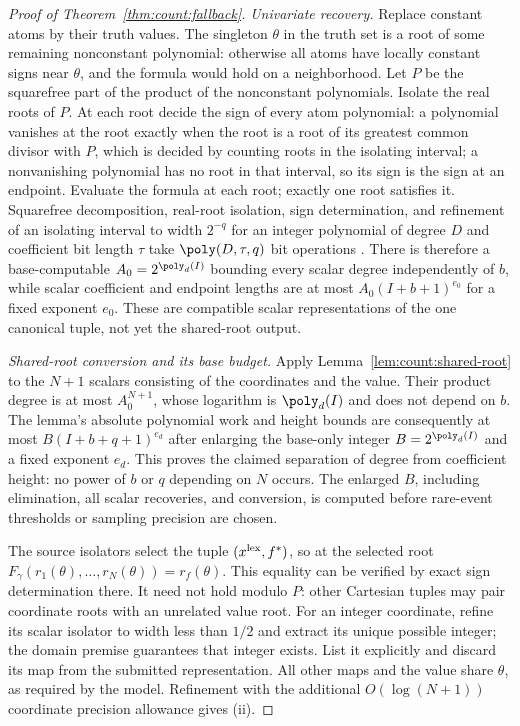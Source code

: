 \begin{proof}[Proof of Theorem~\ref{thm:count:fallback}]
\emph{Univariate recovery.} Replace constant atoms by their truth values. The
singleton $\theta$ in the truth set is a root of some remaining nonconstant
polynomial: otherwise all atoms have locally constant signs near $\theta$, and
the formula would hold on a neighborhood. Let $P$ be the squarefree part of
the product of the nonconstant polynomials. Isolate the real roots of $P$.
At each root decide the sign of every atom polynomial: a polynomial vanishes
at the root exactly when the root is a root of its greatest common divisor
with $P$, which is decided by counting roots in the isolating interval; a
nonvanishing polynomial has no root in that interval, so its sign is the sign
at an endpoint. Evaluate the formula at each root; exactly one root satisfies
it. Squarefree decomposition, real-root isolation, sign determination, and
refinement of an isolating interval to width $2^{-q}$ for an integer
polynomial of degree $D$ and coefficient bit length $\tau$ take
$\poly(D,\tau,q)$ bit operations
\cite{basu2006-algorithms-in-real-algebraic-geometry,mehlhorn2015-from-approximate-factorization-to-root}.
There is therefore a base-computable $A_0=2^{\poly_d(I)}$ bounding every
scalar degree independently of $b$, while scalar coefficient and endpoint
lengths are at most $A_0(I+b+1)^{e_0}$ for a fixed exponent $e_0$.
These are compatible scalar representations of the one canonical tuple,
not yet the shared-root output.

\emph{Shared-root conversion and its base budget.} Apply
Lemma~\ref{lem:count:shared-root} to the $N+1$ scalars consisting of the
coordinates and the value. Their product degree is at most
$A_0^{N+1}$, whose logarithm is $\poly_d(I)$ and does not depend on $b$.
The lemma's absolute polynomial work and height bounds are consequently
at most $B(I+b+q+1)^{e_d}$ after enlarging the base-only integer
$B=2^{\poly_d(I)}$ and a fixed exponent $e_d$. This proves the claimed
separation of degree from coefficient height: no power of $b$ or $q$
depending on $N$ occurs. The enlarged $B$, including elimination, all
scalar recoveries, and conversion, is computed before rare-event
thresholds or sampling precision are chosen.

The source isolators select the tuple
$(x^{\rm lex},f^*)$, so at the selected root
$F_\gamma(r_1(\theta),\dots,r_N(\theta))=r_f(\theta)$.
This equality can be verified by exact sign determination there. It need
not hold modulo $P$: other Cartesian tuples may pair coordinate roots
with an unrelated value root. For an integer coordinate, refine its scalar
isolator to width less than $1/2$ and extract its unique possible integer;
the domain premise guarantees that integer exists. List it explicitly and
discard its map from the submitted representation. All other maps and the
value share $\theta$, as required by the model. Refinement with the
additional $O(\log(N+1))$ coordinate precision allowance gives (ii).


\end{proof}
